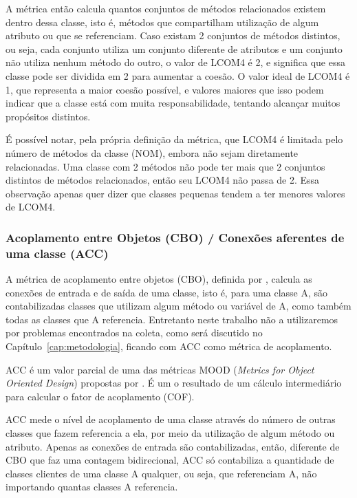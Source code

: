 A métrica então calcula quantos conjuntos de métodos relacionados existem dentro dessa classe, isto é, métodos que compartilham utilização de algum atributo ou que se referenciam. Caso existam 2 conjuntos de métodos distintos, ou seja, cada conjunto utiliza um conjunto diferente de atributos e um conjunto não utiliza nenhum método do outro, o valor de LCOM4 é 2, e significa que essa classe pode ser dividida em 2 para aumentar a coesão. O valor ideal de LCOM4 é 1, que representa a maior coesão possível, e valores maiores que isso podem indicar que a classe está com muita responsabilidade, tentando alcançar muitos propósitos distintos.

É possível notar, pela própria definição da métrica, que LCOM4 é limitada pelo número de métodos da classe (NOM), embora não sejam diretamente relacionadas. Uma classe com 2 métodos não pode ter mais que 2 conjuntos distintos de métodos relacionados, então seu LCOM4 não passa de 2. Essa observação apenas quer dizer que classes pequenas tendem a ter menores valores de LCOM4.

\subsubsection{Acoplamento entre Objetos (CBO) / Conexões aferentes de uma classe (ACC)}

A métrica de acoplamento entre objetos (CBO), definida por , calcula as conexões de entrada e de saída de uma classe, isto é, para uma classe A, são contabilizadas classes que utilizam algum método ou variável de A, como também todas as classes que A referencia. Entretanto neste trabalho não a utilizaremos por problemas encontrados na coleta, como será discutido no Capítulo~\ref{cap:metodologia}, ficando com ACC como métrica de acoplamento.

ACC é um valor parcial de uma das métricas MOOD (\textit{Metrics for Object Oriented Design}) propostas por . É um o resultado de um cálculo intermediário para calcular o fator de acoplamento (COF). 

ACC mede o nível de acoplamento de uma classe através do número de outras classes que fazem referencia a ela, por meio da utilização de algum método ou atributo. Apenas as conexões de entrada são contabilizadas, então, diferente de CBO que faz uma contagem bidirecional, ACC só contabiliza a quantidade de classes clientes de uma classe A qualquer, ou seja, que referenciam A, não importando quantas classes A referencia.

